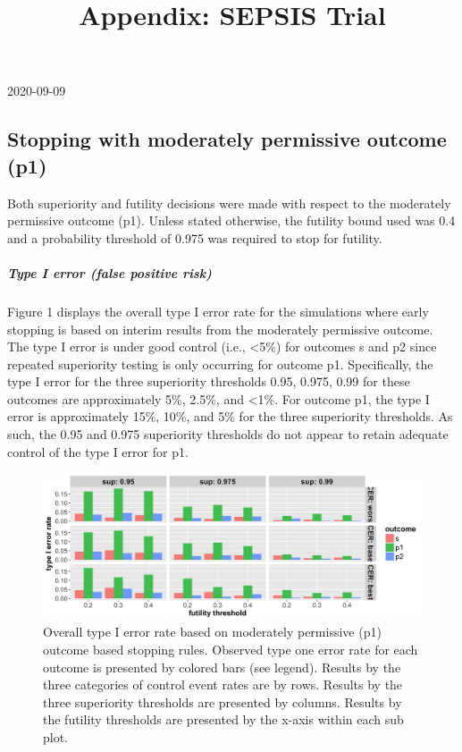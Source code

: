 \documentclass[]{article}
\title{Appendix: SEPSIS Trial}
\author{}
\date{\vspace{-2.5em}}
\let\oldsubparagraph\subparagraph
\renewcommand{\subparagraph}[1]{\oldsubparagraph{#1}\mbox{}}
\begin{document}
\maketitle

2020-09-09

\hypertarget{stopping-with-moderately-permissive-outcome-p1}{%
\subsection{Stopping with moderately permissive outcome
(p1)}\label{stopping-with-moderately-permissive-outcome-p1}}

Both superiority and futility decisions were made with respect to the
moderately permissive outcome (p1). Unless stated otherwise, the
futility bound used was 0.4 and a probability threshold of 0.975 was
required to stop for futility.

\hypertarget{type-i-error-false-positive-risk}{%
\subparagraph{Type I error (false positive
risk)}\label{type-i-error-false-positive-risk}}

Figure 1 displays the overall type I error rate for the simulations
where early stopping is based on interim results from the moderately
permissive outcome. The type I error is under good control (i.e.,
\textless{}5\%) for outcomes s and p2 since repeated superiority testing
is only occurring for outcome p1. Specifically, the type I error for the
three superiority thresholds 0.95, 0.975, 0.99 for these outcomes are
approximately 5\%, 2.5\%, and \textless{}1\%. For outcome p1, the type I
error is approximately 15\%, 10\%, and 5\% for the three superiority
thresholds. As such, the 0.95 and 0.975 superiority thresholds do not
appear to retain adequate control of the type I error for p1.

\captionsetup[figure]{font=small,labelfont=small}

\begin{figure}
  \caption{Overall type I error rate based on moderately permissive (p1) outcome based stopping rules. Observed type one
  error rate for each outcome is presented by colored bars (see legend). Results by the three categories of control
  event rates are by rows. Results by the three superiority thresholds are presented by columns. Results by the futility
  thresholds are presented by the x-axis within each sub plot.}
  \includegraphics{../plots/stop_p1_new/alpha_sim_05_stopp1_new.png}
\end{figure}
\end{document}
